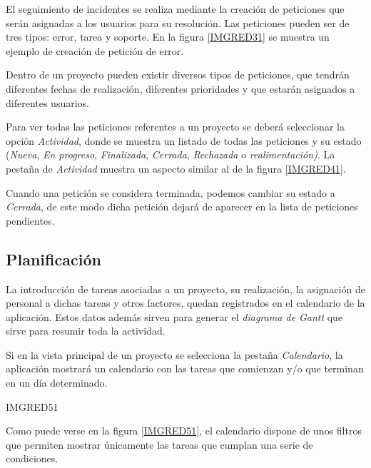 \documentclass[11pt,a4paper,spanish,twoside]{report}
\begin{document}
        El seguimiento de incidentes se realiza mediante la creación de
        peticiones que serán asignadas a los usuarios para su resolución. Las
        peticiones pueden ser de tres tipos: error, tarea y soporte. En la
        figura \ref{IMGRED31} se muestra un ejemplo de creación de petición de
        error.


        Dentro de un proyecto pueden existir diversos tipos de peticiones,
        que tendrán diferentes fechas de realización, diferentes prioridades
        y que estarán asignados a diferentes usuarios. 

        Para ver todas las peticiones referentes a un proyecto se deberá
        seleccionar la opción \emph{Actividad}, donde se muestra un listado
        de todas las peticiones y su estado (\emph{Nueva}, \emph{En progreso},
				\emph{Finalizada}, \emph{Cerrada}, \emph{Rechazada} o
				\emph{realimentación)}. La pestaña de \emph{Actividad} muestra un
				aspecto similar al de la figura \ref{IMGRED41}.


        Cuando una petición se considera terminada, podemos cambiar su estado
        a \emph{Cerrada}, de este modo dicha petición dejará de aparecer en la
				lista de peticiones	pendientes.

	\subsection{Planificación}
	La introducción de tareas asociadas a un proyecto, su realización, la
	asignación de personal a dichas tareas y otros factores, quedan registrados
	en el calendario de la aplicación. Estos datos además sirven para generar
	el \emph{diagrama de Gantt} que sirve para resumir toda la actividad.

	Si en la vista principal de un proyecto se selecciona la pestaña
	\emph{Calendario}, la aplicación mostrará un calendario con las tareas
	que comienzan y/o que terminan en un día determinado.

	{IMGRED51}

	Como puede verse en la figura \ref{IMGRED51}, el calendario dispone de unos
	filtros que permiten mostrar únicamente	las tareas que cumplan una serie de
	condiciones.
	
\end{document}
